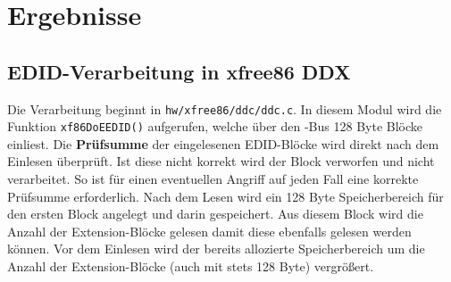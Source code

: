 
\section{Ergebnisse}
\label{sec:conclusion}

\subsection{EDID-Verarbeitung in xfree86 DDX}
Die Verarbeitung beginnt in \texttt{hw/xfree86/ddc/ddc.c}. In diesem Modul wird die Funktion \texttt{xf86DoEEDID()} aufgerufen, welche über den \interintegratedbus-Bus 128 Byte Blöcke einliest.
Die \textbf{Prüfsumme} der eingelesenen EDID-Blöcke wird direkt nach dem Einlesen überprüft. Ist diese nicht korrekt wird der Block verworfen und nicht verarbeitet. So ist für einen eventuellen Angriff auf jeden Fall 
eine korrekte Prüfsumme erforderlich.
Nach dem Lesen wird ein 128 Byte Speicherbereich für den ersten Block angelegt und darin gespeichert. 
Aus diesem Block wird die Anzahl der Extension-Blöcke gelesen damit diese ebenfalls gelesen werden können. 
Vor dem Einlesen wird der bereits allozierte Speicherbereich um die Anzahl der Extension-Blöcke (auch mit stets 128 Byte) vergrößert.

